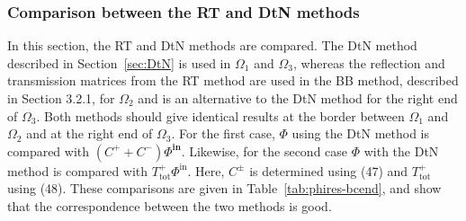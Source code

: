 \documentclass[numreferences]{kluwer}
\renewcommand{\Phi}{\varPhi}
\renewcommand{\Re}{\operatorname{Re}}
\renewcommand{\vec}[1]{\bm{#1}}
\renewcommand{\Phi}{\varPhi}
\newcommand{\Phiin}{\vec\Phi^{\text{in}}}
\newcommand{\Ttot}{T^+_{\text{tot}}}
\begin{document}

\subsubsection{Comparison between the RT and DtN methods}
\label{sec:RT-DtN}

In this section, the RT and DtN methods are compared. The DtN method
described in Section~\ref{sec:DtN} is used in $\Omega_1$ and
$\Omega_3$, whereas the reflection and transmission matrices from the
RT method are used in the BB method, described in Section 3.2.1, for
$\Omega_2$ and is an alternative to the DtN method for the right end
of $\Omega_3$. Both methods should give identical results at the
border between $\Omega_1$ and $\Omega_2$ and at the right end of
$\Omega_3$. For the first case, $\vec\Phi$ using the DtN method is
compared with $(C^++C^−)\vec\Phiin$. Likewise, for the second case
$\vec\Phi$ with the DtN method is compared with $\Ttot\Phiin$.  Here,
$C^\pm$ is determined using (47) and $\Ttot$ using (48). These
comparisons are given in Table~\ref{tab:phires-bcend}, and show that
the correspondence between the two methods is good.

\end{document}
